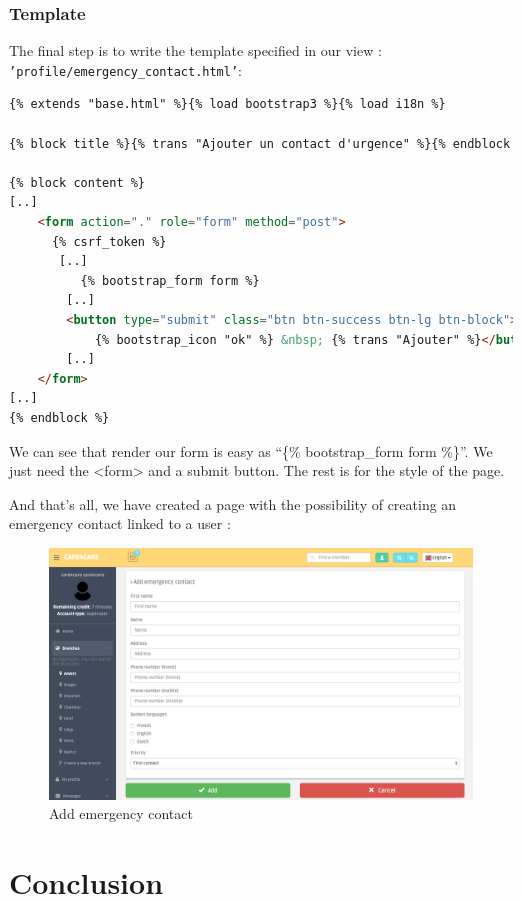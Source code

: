 \documentclass[11pt, a4paper]{article}   	%
\begin{document}
\subsubsection{Template}

The final step is to write the template specified in our view : \texttt{'profile/emergency\_contact.html'}:

\begin{lstlisting}[language=HTML, basicstyle=\footnotesize]
{% extends "base.html" %}{% load bootstrap3 %}{% load i18n %}

{% block title %}{% trans "Ajouter un contact d'urgence" %}{% endblock %}

{% block content %}
[..]
    <form action="." role="form" method="post">
      {% csrf_token %}
       [..]
          {% bootstrap_form form %}
        [..]
        <button type="submit" class="btn btn-success btn-lg btn-block">
            {% bootstrap_icon "ok" %} &nbsp; {% trans "Ajouter" %}</button>
        [..]
    </form>
[..]
{% endblock %}
\end{lstlisting}

We can see that render our form is easy as ``\{\% bootstrap\_form form \%\}''. We just need the <form> and a submit button. The rest is for the style of the page.

And that's all, we have created a page with the possibility of creating an emergency contact linked to a user :

\begin{figure}[!ht]
   \includegraphics[width=\linewidth]{addec.png}
   \caption{Add emergency contact}
\end{figure}






\section{Conclusion}
\end{document}
